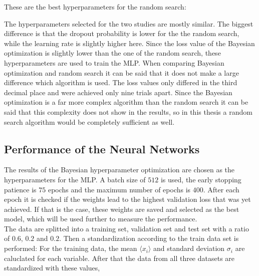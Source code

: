 These are the best hyperparameters for the random search:


The hyperparameters selected for the two studies are mostly similar. The biggest difference is that the dropout probability is lower for the the random search, while the learning rate is slightly higher here. 
Since the loss value of the Bayesian optimization is slightly lower than the one of the random search, these hyperparameters are used to train the MLP.
When comparing Bayesian optimization and random search it can be said that it does not make a large difference which algorithm is used. The loss values only differed in the third decimal place
and were achieved only nine trials apart. Since the Bayesian optimization is a far more complex algorithm than the random search it can be said that this complexity does not show in the results,
so in this thesis a random search algorithm would be completely sufficient as well.

\subsection{Performance of the Neural Networks}
\label{subsec:perfgat}

The results of the Bayesian hyperparameter optimization are chosen as the hyperparameters for the MLP. A batch size of $512$ is used, the early stopping patience is $75$ epochs and the maximum
number of epochs is $400$. After each epoch it is checked if the weights lead to the highest validation loss that was yet achieved. If that is the case, these weights are saved and selected as the best model,
which will be used further to measure the performance. \\

The data are splitted into a training set, validation set and test set with a ratio of $0.6$, $0.2$ and $0.2$. Then a standardization according to the train data set is performed: For the training data,
the mean $\langle x_i \rangle$ and standard deviation $\sigma_i$ are caluclated for each variable. After that the data from all three datasets are standardized with these values,

